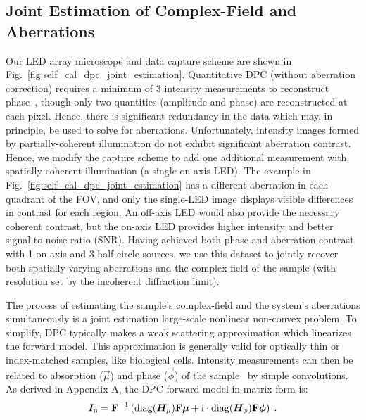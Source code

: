 \subsection{Joint Estimation of Complex-Field and Aberrations}

Our LED array microscope and data capture scheme are shown in Fig.~\ref{fig:self_cal_dpc_joint_estimation}. Quantitative DPC (without aberration correction) requires a minimum of 3 intensity measurements to reconstruct phase~\cite{PhillipsChen17cDPC}, though only two quantities (amplitude and phase) are reconstructed at each pixel. Hence, there is significant redundancy in the data which may, in principle, be used to solve for aberrations. Unfortunately, intensity images formed by partially-coherent illumination do not exhibit significant aberration contrast. Hence, we modify the capture scheme to add one additional measurement with spatially-coherent illumination (a single on-axis LED). The example in Fig.~\ref{fig:self_cal_dpc_joint_estimation} has a different aberration in each quadrant of the FOV, and only the single-LED image displays visible differences in contrast for each region. An off-axis LED would also provide the necessary coherent contrast, but the on-axis LED provides higher intensity and better signal-to-noise ratio (SNR). Having achieved both phase and aberration contrast with 1 on-axis and 3 half-circle sources, we use this dataset to jointly recover both spatially-varying aberrations and the complex-field of the sample (with resolution set by the incoherent diffraction limit).

The process of estimating the sample's complex-field and the system's aberrations simultaneously is a joint estimation large-scale nonlinear non-convex problem. To simplify, DPC typically makes a weak scattering approximation which linearizes the forward model. This approximation is generally valid for optically thin or index-matched samples, like biological cells. Intensity measurements can then be related to absorption ($\vec{\mu}$) and phase ($\vec{\phi}$) of the sample~\cite{tian2015quantitative,PhillipsChen17cDPC} by simple convolutions. As derived in Appendix A, the DPC forward model in matrix form is:
\begin{equation}
\label{eq:forwardmodel}
\bm{I}_{\mathrm{n}} = \boldsymbol{\mathbf{F}}^{-1}\left(\mathrm{diag}(\bm{H}_{\mu})\boldsymbol{\mathbf{F}}\bm{\mu} + \mathrm{i}\cdot\mathrm{diag}(\bm{H}_{\phi})\boldsymbol{\mathbf{F}}\bm{\phi}\right)\;.
\end{equation}


